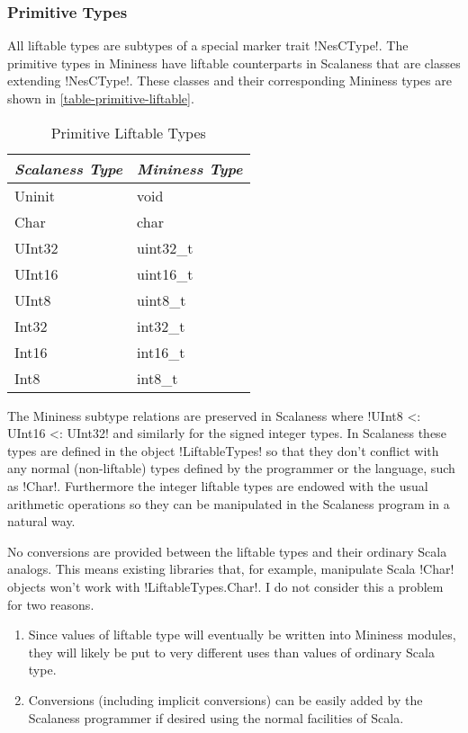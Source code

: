 \subsubsection{Primitive Types}
\label{section-primitive-types-design}

All liftable types are subtypes of a special marker trait !NesCType!. The primitive types in
Mininess have liftable counterparts in Scalaness that are classes extending !NesCType!. These
classes and their corresponding Mininess types are shown in \autoref{table-primitive-liftable}.

\begin{table}
  \centering
  \caption{Primitive Liftable Types}
  \label{table-primitive-liftable}
  \begin{tabular}{|l|l|} \hline
    \textit{Scalaness Type} & \textit{Mininess Type} \\ \hline
    Uninit & void      \\ \hline
    Char   & char      \\ \hline
    UInt32 & uint32\_t \\ \hline
    UInt16 & uint16\_t \\ \hline
    UInt8  & uint8\_t  \\ \hline
    Int32  & int32\_t  \\ \hline
    Int16  & int16\_t  \\ \hline
    Int8   & int8\_t   \\ \hline
  \end{tabular}
\end{table}

The Mininess subtype relations are preserved in Scalaness where !UInt8 <: UInt16 <: UInt32! and
similarly for the signed integer types. In Scalaness these types are defined in the object
!LiftableTypes! so that they don't conflict with any normal (non-liftable) types defined by the
programmer or the language, such as !Char!. Furthermore the integer liftable types are endowed
with the usual arithmetic operations so they can be manipulated in the Scalaness program in a
natural way.

No conversions are provided between the liftable types and their ordinary Scala analogs. This
means existing libraries that, for example, manipulate Scala !Char! objects won't work with
!LiftableTypes.Char!. I do not consider this a problem for two reasons.
\begin{enumerate}
\item Since values of liftable type will eventually be written into Mininess modules, they will
  likely be put to very different uses than values of ordinary Scala type.
\item Conversions (including implicit conversions) can be easily added by the Scalaness
  programmer if desired using the normal facilities of Scala.
\end{enumerate}

